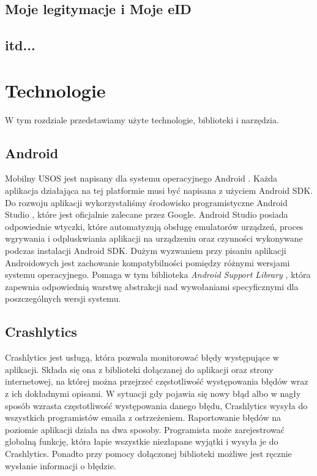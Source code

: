 \documentclass{pracamgr}
\begin{document}
\section{Moje legitymacje i Moje eID}

\section{itd...}

\chapter{Technologie}

W tym rozdziale przedstawiamy użyte technologie, biblioteki i narzędzia.

\section{Android}

Mobilny USOS jest napisany dla systemu operacyjnego Android \cite{android}.
Każda aplikacja działająca na tej platformie musi być napisana z użyciem Android
SDK. Do rozwoju aplikacji wykorzystaliśmy środowisko programistyczne Android Studio
\cite{androidstudio}, które jest oficjalnie zalecane przez Google. Android Studio
posiada odpowiednie wtyczki, które automatyzują obsługę emulatorów urządzeń, proces
wgrywania i odpluskwiania aplikacji na urządzeniu oraz czynności wykonywane podczas
instalacji Android SDK. Dużym wyzwaniem przy pisaniu aplikacji Androidowych jest
zachowanie kompatybilności pomiędzy różnymi wersjami systemu operacyjnego. Pomaga
w tym biblioteka \textit{Android Support Library} \cite{androidsupportlibrary},
która zapewnia odpowiednią warstwę abstrakcji nad wywołaniami specyficznymi dla
poszczególnych wersji systemu.

\section{Crashlytics}

Crashlytics \cite{crashlytics} jest usługą, która pozwala monitorować błędy
występujące w aplikacji. Składa się ona z biblioteki dołączanej do aplikacji
oraz strony internetowej, na której można przejrzeć częstotliwość występowania
błędów wraz z ich dokładnymi opisami. W sytuacji gdy pojawia się nowy błąd albo
w nagły sposób wzrasta częstotliwość występowania danego błędu, Crashlytics wysyła
do wszystkich programistów emaila z ostrzeżeniem. Raportowanie błędów na poziomie
aplikacji działa na dwa sposoby. Programista może zarejestrować globalną funkcję,
która łapie wszystkie niezłapane wyjątki i wysyła je do Crashlytics. Ponadto przy
pomocy dołączonej biblioteki możliwe jest ręcznie wysłanie informacji o błędzie.
\end{document}

